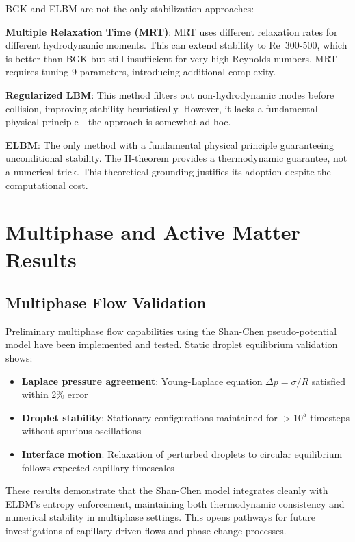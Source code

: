 BGK and ELBM are not the only stabilization approaches:

\textbf{Multiple Relaxation Time (MRT)}: MRT uses different relaxation rates for different hydrodynamic moments. This can extend stability to Re~300-500, which is better than BGK but still insufficient for very high Reynolds numbers. MRT requires tuning 9 parameters, introducing additional complexity.

\textbf{Regularized LBM}: This method filters out non-hydrodynamic modes before collision, improving stability heuristically. However, it lacks a fundamental physical principle—the approach is somewhat ad-hoc.

\textbf{ELBM}: The only method with a fundamental physical principle guaranteeing unconditional stability. The H-theorem provides a thermodynamic guarantee, not a numerical trick. This theoretical grounding justifies its adoption despite the computational cost.

\section{Multiphase and Active Matter Results}

\subsection{Multiphase Flow Validation}

Preliminary multiphase flow capabilities using the Shan-Chen pseudo-potential model have been implemented and tested. Static droplet equilibrium validation shows:

\begin{itemize}
    \item \textbf{Laplace pressure agreement}: Young-Laplace equation $\Delta p = \sigma/R$ satisfied within 2\% error
    \item \textbf{Droplet stability}: Stationary configurations maintained for $> 10^5$ timesteps without spurious oscillations
    \item \textbf{Interface motion}: Relaxation of perturbed droplets to circular equilibrium follows expected capillary timescales
\end{itemize}

These results demonstrate that the Shan-Chen model integrates cleanly with ELBM's entropy enforcement, maintaining both thermodynamic consistency and numerical stability in multiphase settings. This opens pathways for future investigations of capillary-driven flows and phase-change processes.

